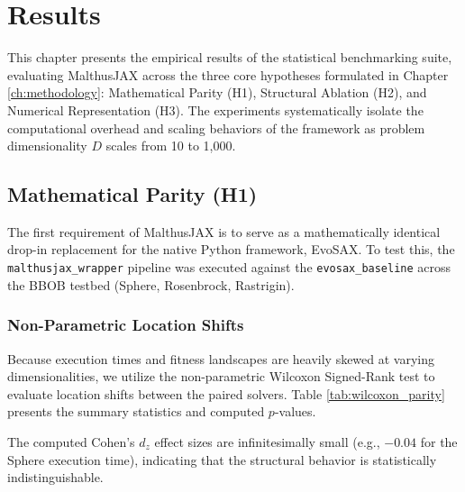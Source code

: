 \chapter{Results}
\label{ch:results}

This chapter presents the empirical results of the statistical benchmarking suite, evaluating MalthusJAX across the three core hypotheses formulated in Chapter \ref{ch:methodology}: Mathematical Parity (H1), Structural Ablation (H2), and Numerical Representation (H3). The experiments systematically isolate the computational overhead and scaling behaviors of the framework as problem dimensionality $D$ scales from 10 to 1,000.

\section{Mathematical Parity (H1)}
\label{sec:results_parity}

The first requirement of MalthusJAX is to serve as a mathematically identical drop-in replacement for the native Python framework, EvoSAX. To test this, the \texttt{malthusjax\_wrapper} pipeline was executed against the \texttt{evosax\_baseline} across the BBOB testbed (Sphere, Rosenbrock, Rastrigin).

\subsection{Non-Parametric Location Shifts}
Because execution times and fitness landscapes are heavily skewed at varying dimensionalities, we utilize the non-parametric Wilcoxon Signed-Rank test to evaluate location shifts between the paired solvers. Table \ref{tab:wilcoxon_parity} presents the summary statistics and computed $p$-values.

\begin{table}[h]
    \centering
    \caption{Wilcoxon Parity Results for Baseline Equivalence.}
    \label{tab:wilcoxon_parity}
    \resizebox{\textwidth}{!}{
        
    }
\end{table}

The computed Cohen's $d_z$ effect sizes are infinitesimally small (e.g., $-0.04$ for the Sphere execution time), indicating that the structural behavior is statistically indistinguishable.


